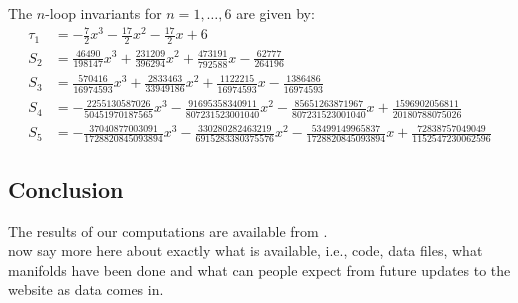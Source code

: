 \documentclass[12pt]{amsart}
\theoremstyle{definition}
\begin{document}
The $n$-loop invariants for $n=1,\dots,6$ are given by:
{\small
\begin{align*}
\tau_1 &=-\frac{7}{2} x^{3} - \frac{17}{2} x^{2} - \frac{17}{2} x + 6
\\
S_2 &= \frac{46490}{198147} x^{3} + \frac{231209}{396294} x^{2} 
+ \frac{473191}{792588} x - \frac{62777}{264196}
\\
S_3 &= \frac{570416}{16974593} x^{3} + \frac{2833463}{33949186} x^{2} 
+ \frac{1122215}{16974593} x - \frac{1386486}{16974593}
\\
S_4 &= -\frac{2255130587026}{50451970187565} x^{3} 
- \frac{91695358340911}{807231523001040} x^{2} 
- \frac{85651263871967}{807231523001040} x 
+ \frac{1596902056811}{20180788075026}
\\
S_5 &= -\frac{37040877003091}{1728820845093894} x^{3} 
- \frac{330280282463219}{6915283380375576} x^{2} 
- \frac{53499149965837}{1728820845093894} x 
+ \frac{72838757049049}{1152547230062596}
\end{align*}
}
{\color{red}
\subsection{Conclusion}
The results of our computations are available from \cite{nloop-compute}.\\
now say more here about exactly what is available, i.e., code, data files,
what manifolds have been done and what can people expect from future
updates to the website as data comes in.}




\end{document}
